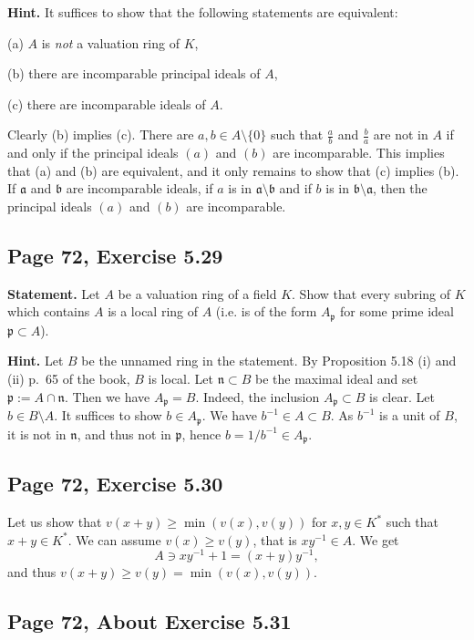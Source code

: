\documentclass[parskip=half,fontsize=12pt]{scrartcl}%
\newcommand{\mf}{\mathfrak}
\newcommand{\aaa}{\mf a}
\newcommand{\bbb}{\mf b}
\newcommand{\nnn}{\mf n}
\newcommand{\ppp}{\mf p}
\begin{document}
\textbf{Hint.} It suffices to show that the following statements are equivalent:

(a) $A$ is \emph{not} a valuation ring of $K$,

(b) there are incomparable principal ideals of $A$,

(c) there are incomparable ideals of $A$.

Clearly (b) implies (c). There are $a,b\in A\setminus\{0\}$ such that $\frac ab$ and $\frac ba$ are not in $A$ if and only if the principal ideals $(a)$ and $(b)$ are incomparable. This implies that (a) and (b) are equivalent, and it only remains to show that (c) implies (b). If $\aaa$ and $\bbb$ are incomparable ideals, if $a$ is in $\aaa\setminus\bbb$ and if $b$ is in $\bbb\setminus\aaa$, then the principal ideals $(a)$ and $(b)$ are incomparable.

\subsection{Page 72, Exercise 5.29}%

\textbf{Statement.} Let $A$ be a valuation ring of a field $K$. Show that every subring of $K$ which contains $A$ is a local ring of $A$ (i.e. is of the form $A_\ppp$ for some prime ideal $\ppp\subset A$).

\textbf{Hint.} Let $B$ be the unnamed ring in the statement. By Proposition 5.18 (i) and (ii) p.~65 of the book, $B$ is local. Let $\nnn\subset B$ be the maximal ideal and set $\ppp:=A\cap\nnn$. Then we have $A_\ppp=B$. Indeed, the inclusion $A_\ppp\subset B$ is clear. Let $b\in B\setminus A$. It suffices to show $b\in A_\ppp$. We have $b^{-1}\in A\subset B$. As $b^{-1}$ is a unit of $B$, it is not in $\nnn$, and thus not in $\ppp$, hence $b=1/b^{-1}\in A_\ppp$.

\subsection{Page 72, Exercise 5.30}%

Let us show that $v(x+y)\ge\min(v(x),v(y))$ for $x,y\in K^*$ such that $x+y\in K^*$. We can assume $v(x)\ge v(y)$, that is $xy^{-1}\in A$. We get 
$$
A\ni xy^{-1}+1=(x+y)y^{-1},
$$ 
and thus $v(x+y)\ge v(y)=\min(v(x),v(y))$.

\subsection{Page 72, About Exercise 5.31}%
\end{document}
